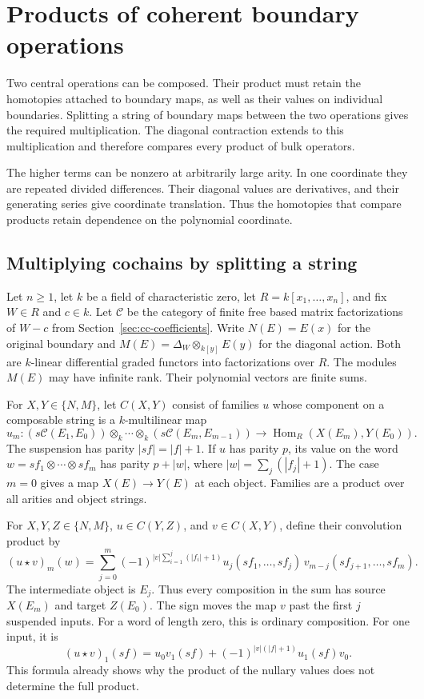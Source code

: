 \chapter{Products of coherent boundary operations}
\label{ch:mc-products}

Two central operations can be composed. Their product must retain
the homotopies attached to boundary maps, as well as their values
on individual boundaries. Splitting a string of boundary maps
between the two operations gives the required multiplication.
The diagonal contraction extends to this multiplication and
therefore compares every product of bulk operators.

The higher terms can be nonzero at arbitrarily large arity.
In one coordinate they are repeated divided differences.
Their diagonal values are derivatives, and their generating
series give coordinate translation. Thus the homotopies that
compare products retain dependence on the polynomial coordinate.

\section{Multiplying cochains by splitting a string}
\label{sec:mc-convolution}

Let \(n\geq1\), let \(k\) be a field of characteristic zero,
let \(R=k[x_1,\ldots,x_n]\),
and fix \(W\in R\) and \(c\in k\). Let \(\mathcal C\) be the
category of finite free based matrix factorizations of \(W-c\)
from Section~\ref{sec:cc-coefficients}.
Write \(N(E)=E(x)\) for the original boundary and
\(M(E)=\Delta_W\otimes_{k[y]}E(y)\) for the diagonal action.
Both are \(k\)-linear differential graded functors into
factorizations over \(R\). The modules \(M(E)\) may have
infinite rank. Their polynomial vectors are finite sums.

For \(X,Y\in\{N,M\}\), let \(C(X,Y)\) consist of families \(u\)
whose component on a composable string is a \(k\)-multilinear map
\[
 u_m:(s\mathcal C(E_1,E_0))\otimes_k\cdots\otimes_k
          (s\mathcal C(E_m,E_{m-1}))
       \longrightarrow\operatorname{Hom}_R(X(E_m),Y(E_0)).
\]
The suspension has parity \(|sf|=|f|+1\).
If \(u\) has parity \(p\), its value on the word
\(w=sf_1\otimes\cdots\otimes sf_m\) has parity \(p+|w|\),
where \(|w|=\sum_j(|f_j|+1)\).
The case \(m=0\) gives a map \(X(E)\to Y(E)\) at each object.
Families are a product over all arities and object strings.

For \(X,Y,Z\in\{N,M\}\), \(u\in C(Y,Z)\), and
\(v\in C(X,Y)\), define their
convolution product by
\begin{equation}
 (u\star v)_m(w)
 =\sum_{j=0}^m
 (-1)^{|v|\sum_{i=1}^j(|f_i|+1)}
 u_j(sf_1,\ldots,sf_j)\,
 v_{m-j}(sf_{j+1},\ldots,sf_m).
 \label{eq:mc-cup}
\end{equation}
The intermediate object is \(E_j\). Thus every composition
in the sum has source \(X(E_m)\) and target \(Z(E_0)\).
The sign moves the map \(v\) past the first \(j\) suspended
inputs. For a word of length zero, this is ordinary composition.
For one input, it is
\[
 (u\star v)_1(sf)
    =u_0v_1(sf)+(-1)^{|v|(|f|+1)}u_1(sf)v_0.
\]
This formula already shows why the product of the nullary
values does not determine the full product.

